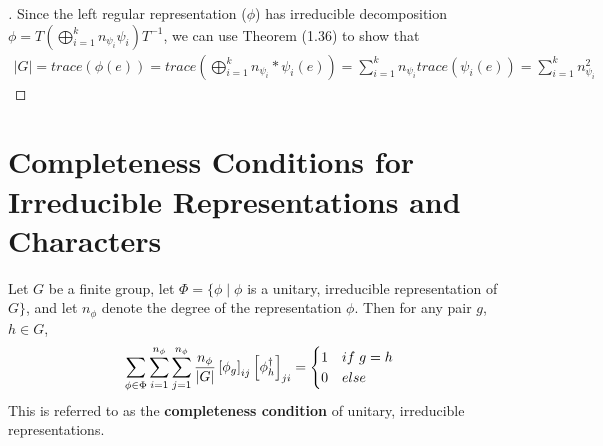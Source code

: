 \noindent\begin{proof}[\cite{Tung}] Since the left regular representation ($\phi$) has irreducible decomposition $\phi = T\left(\bigoplus_{i=1}^k n_{\psi_i}\psi_i\right)T^{-1}$, we can use Theorem (1.36) to show that
\begin{equation}
	\begin{aligned}
		|G| = trace(\phi(e)) = trace\left(\bigoplus_{i=1}^k n_{\psi_i}*\psi_i(e)\right) = \sum_{i=1}^k n_{\psi_i}trace(\psi_i(e)) = \sum_{i=1}^k n_{\psi_i}^2 
	\end{aligned}
\end{equation}
\end{proof}

\section{Completeness Conditions for Irreducible Representations and Characters}


\begin{theorem}
	Let $G$ be a finite group, let $\Phi = \{\phi \mid \phi$ is a unitary, irreducible representation of $G\}$, and let $n_\phi$ denote the degree of the representation $\phi$. Then for any pair $g$, $h \in G$, 
$$\sum_{\phi \in \Phi} \sum_{i=1}^{n_\phi} \sum_{j=1}^{n_\phi} \frac{n_\phi}{|G|} \left[\phi_g\right]_{ij}\left[\phi_{h}^\dag\right]_{ji} = \begin{cases}
																										1 & if \hspace{1mm} g = h \\
																										0 & else
																									\end{cases}$$
This is referred to as the \textbf{completeness condition} of unitary, irreducible representations.
\end{theorem}

